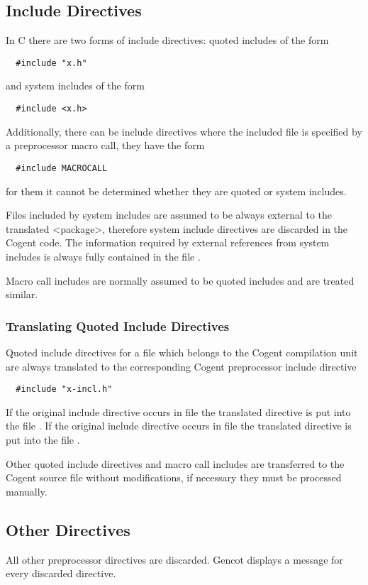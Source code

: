 \subsection{Include Directives}

In C there are two forms of include directives: quoted includes of the form
\begin{verbatim}
  #include "x.h"
\end{verbatim}
and system includes of the form
\begin{verbatim}
  #include <x.h>
\end{verbatim}
Additionally, there can be include directives where the included file is specified by a preprocessor macro call,
they have the form
\begin{verbatim}
  #include MACROCALL
\end{verbatim}
for them it cannot be determined whether they are quoted or system includes.

Files included by system includes are assumed to be always external to the translated <package>, therefore system
include directives are discarded in the Cogent code. The information required by external references from system 
includes is always fully contained in the file .

Macro call includes are normally assumed to be quoted includes and are treated similar.

\subsubsection{Translating Quoted Include Directives}

Quoted include directives for a file  which belongs to the Cogent compilation unit are always translated 
to the corresponding Cogent preprocessor include directive
\begin{verbatim}
  #include "x-incl.h"
\end{verbatim}
If the original include directive occurs in file  the translated directive is put into the file 
. If the original include directive occurs in file  the translated directive is put into the file
. 

Other quoted include directives and macro call includes are transferred to the Cogent source file without modifications, if
necessary they must be processed manually.

\subsection{Other Directives}

All other preprocessor directives are discarded. Gencot displays a message for every discarded directive.

 

